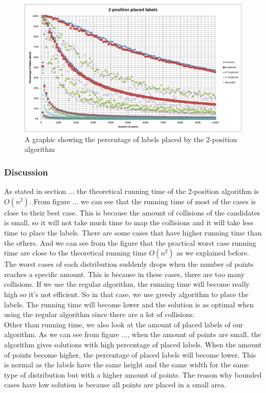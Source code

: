 \documentclass[crop=false,a4paper,oneside,11pt]{standalone}
\begin{document}
\begin{figure}[h!]
 \centering
  \centerline{\includegraphics[scale = 0.5]{2PosLabelsPlaced.png}}
  \caption{A graphic showing the percentage of labels placed by the 2-position algorithm}
 \end{figure}
\subsubsection{Discussion}
As stated in section ... the theoretical running time of the 2-position algorithm is $O(n^2)$. From figure ... we can see that the running time of most of the cases is close to their best case. This is because the amount of collisions of the candidates is small, so it will not take much time to map the collisions and it will take less time to place the labels. There are some cases that have higher running time than the others. And we can see from the figure that the practical worst case running time are close to the theoretical running time $O(n^2)$ as we explained before. \\
The worst cases of each distribution suddenly drops when the number of points reaches a specific amount. This is because in these cases, there are too many collisions. If we use the regular algorithm, the running time will become really high so it's not efficient. So in that case, we use greedy algorithm to place the labels. The running time will become lower and the solution is as optimal when using the regular algorithm since there are a lot of collisions.\\
Other than running time, we also look at the amount of placed labels of our algorithm. As we can see from figure ..., when the amount of points are small, the algorithm gives solutions with high percentage of placed labels. When the amount of points become higher, the percentage of placed labels will become lower. This is normal as the labels have the same height and the same width for the same type of distribution but with a higher amount of points. The reason why bounded cases have low solution is because all points are placed in a small area.\\
\end{document}
